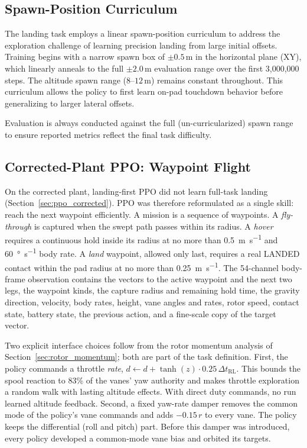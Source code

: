 \documentclass[conference]{IEEEtran}
\begin{document}
\subsection{Spawn-Position Curriculum}

The landing task employs a linear spawn-position curriculum to address the exploration challenge of learning precision landing from large initial offsets. Training begins with a narrow spawn box of $\pm 0.5$\,m in the horizontal plane (XY), which linearly anneals to the full $\pm 2.0$\,m evaluation range over the first 3{,}000{,}000 steps. The altitude spawn range ($8$--$12$\,m) remains constant throughout. This curriculum allows the policy to first learn on-pad touchdown behavior before generalizing to larger lateral offsets.

Evaluation is always conducted against the full (un-curricularized) spawn range to ensure reported metrics reflect the final task difficulty.

\subsection{Corrected-Plant PPO: Waypoint Flight}
\label{sec:ppo_waypoint}

On the corrected plant, landing-first PPO did not learn full-task landing (Section~\ref{sec:ppo_corrected}). PPO was therefore reformulated as a single skill: reach the next waypoint efficiently. A mission is a sequence of waypoints. A \emph{fly-through} is captured when the swept path passes within its radius. A \emph{hover} requires a continuous hold inside its radius at no more than \SI{0.5}{\metre\per\second} and \SI{60}{\degree\per\second} body rate. A \emph{land} waypoint, allowed only last, requires a real LANDED contact within the pad radius at no more than \SI{0.25}{\metre\per\second}. The 54-channel body-frame observation contains the vectors to the active waypoint and the next two legs, the waypoint kinds, the capture radius and remaining hold time, the gravity direction, velocity, body rates, height, vane angles and rates, rotor speed, contact state, battery state, the previous action, and a fine-scale copy of the target vector.

Two explicit interface choices follow from the rotor momentum analysis of Section~\ref{sec:rotor_momentum}; both are part of the task definition. First, the policy commands a throttle \emph{rate}, $d \leftarrow d + \tanh(z)\cdot 0.25\,\Delta t_{\text{RL}}$. This bounds the spool reaction to 83\% of the vanes' yaw authority and makes throttle exploration a random walk with lasting altitude effects. With direct duty commands, no run learned altitude feedback. Second, a fixed yaw-rate damper removes the common mode of the policy's vane commands and adds $-0.15\,r$ to every vane. The policy keeps the differential (roll and pitch) part. Before this damper was introduced, every policy developed a common-mode vane bias and orbited its targets.
\end{document}
